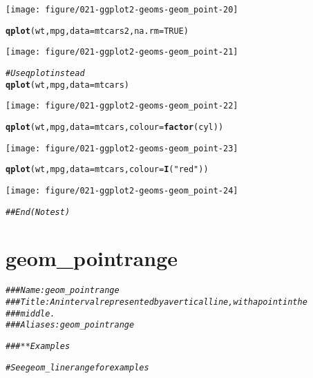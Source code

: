 \documentclass[a4paper,titlepage]{tufte-handout}\usepackage[]{graphicx}\usepackage[]{color}
\makeatletter
\def\maxwidth{ %
  \ifdim\Gin@nat@width>\linewidth
    \linewidth
  \else
    \Gin@nat@width
  \fi
}
\newcommand{\hlnum}[1]{\textcolor[rgb]{0.686,0.059,0.569}{#1}}%
\newcommand{\hlstr}[1]{\textcolor[rgb]{0.192,0.494,0.8}{#1}}%
\newcommand{\hlcom}[1]{\textcolor[rgb]{0.678,0.584,0.686}{\textit{#1}}}%
\newcommand{\hlstd}[1]{\textcolor[rgb]{0.345,0.345,0.345}{#1}}%
\newcommand{\hlkwc}[1]{\textcolor[rgb]{0.333,0.667,0.333}{#1}}%
\newcommand{\hlkwd}[1]{\textcolor[rgb]{0.737,0.353,0.396}{\textbf{#1}}}%
\newenvironment{kframe}{%
 \def\at@end@of@kframe{}%
 \ifinner\ifhmode%
  \def\at@end@of@kframe{\end{minipage}}%
  \begin{minipage}{\columnwidth}%
 \fi\fi%
 \def\FrameCommand##1{\hskip\@totalleftmargin \hskip-\fboxsep
 \colorbox{shadecolor}{##1}\hskip-\fboxsep
     \hskip-\linewidth \hskip-\@totalleftmargin \hskip\columnwidth}%
 \MakeFramed {\advance\hsize-\width
   \@totalleftmargin\z@ \linewidth\hsize
   \@setminipage}}%
 {\par\unskip\endMakeFramed%
 \at@end@of@kframe}
\newenvironment{knitrout}{}{} %
\makeatother
\begin{document}
\begin{knitrout}
\begin{kframe}
{\ttfamily\noindent\color{warningcolor}{\#\# Warning in loop\_apply(n, do.ply): Removed 11 rows containing missing values (geom\_point).}}\end{kframe}
\texttt{[image: figure/021-ggplot2-geoms-geom\_point-20]} 
\begin{kframe}\begin{alltt}
\hlkwd{qplot}\hlstd{(wt, mpg,} \hlkwc{data} \hlstd{= mtcars2,} \hlkwc{na.rm} \hlstd{=} \hlnum{TRUE}\hlstd{)}
\end{alltt}
\end{kframe}
\texttt{[image: figure/021-ggplot2-geoms-geom\_point-21]} 
\begin{kframe}\begin{alltt}
\hlcom{# Use qplot instead}
\hlkwd{qplot}\hlstd{(wt, mpg,} \hlkwc{data} \hlstd{= mtcars)}
\end{alltt}
\end{kframe}
\texttt{[image: figure/021-ggplot2-geoms-geom\_point-22]} 
\begin{kframe}\begin{alltt}
\hlkwd{qplot}\hlstd{(wt, mpg,} \hlkwc{data} \hlstd{= mtcars,} \hlkwc{colour} \hlstd{=} \hlkwd{factor}\hlstd{(cyl))}
\end{alltt}
\end{kframe}
\texttt{[image: figure/021-ggplot2-geoms-geom\_point-23]} 
\begin{kframe}\begin{alltt}
\hlkwd{qplot}\hlstd{(wt, mpg,} \hlkwc{data} \hlstd{= mtcars,} \hlkwc{colour} \hlstd{=} \hlkwd{I}\hlstd{(}\hlstr{"red"}\hlstd{))}
\end{alltt}
\end{kframe}
\texttt{[image: figure/021-ggplot2-geoms-geom\_point-24]} 
\begin{kframe}\begin{alltt}
\hlcom{## End(No test)}
\end{alltt}
\end{kframe}
\end{knitrout}


\section{geom\_pointrange}

\begin{knitrout}
\color{fgcolor}\begin{kframe}
\begin{alltt}
\hlcom{### Name: geom_pointrange}
\hlcom{### Title: An interval represented by a vertical line, with a point in the}
\hlcom{###   middle.}
\hlcom{### Aliases: geom_pointrange}

\hlcom{### ** Examples}

\hlcom{# See geom_linerange for examples}
\end{alltt}
\end{kframe}
\end{knitrout}
\end{document}
